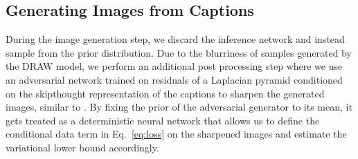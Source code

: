 \documentclass{article} %
\newcommand{\Eqref}[1]{Eq.~\ref{#1}} %
\newcommand{\comm}[1]{}
\newcommand{\henc}{h^{infer}}
\newcommand{\Lat}{Z}
\newcommand{\post}{Q}
\newcommand{\prior}{P}
\newcommand{\loss}{\mathcal{L}}
\begin{document}
\comm{
\begin{align}
\loss &= -\sum_{t=1}^{T}D_{KL}(\post(\Lat_t|\henc_t,s_{t-1})\,||\,\prior(\Lat_t)) + \frac{1}{L}\sum_{l=1}^{L}log\,p(x_{t}|y,z)\\
&=
\frac{1}{2}\sum_{t=1}^{T}(1 - 2\,log\,\sigma_{t}^{prior} + 2\,log\,\sigma_{t} - \frac{\exp(2\,log\,\sigma_{t}) + (\mu_{t} - \mu_{t}^{prior})^{2}}{\exp(2\,log\,\sigma_{t}^{prior})}) + \frac{1}{L}\sum_{l=1}^{L}log\,p(x_{t}|y,z)
\end{align}
}

\subsection{Generating Images from Captions}
\vspace{-0.05in}
During the image generation step, we discard the inference network and instead sample from the prior distribution. 
Due to the blurriness of samples generated by the DRAW model, we perform an additional post processing step where we use an 
adversarial network trained on residuals of a Laplacian pyramid conditioned on the skipthought representation \citep{kiros_skipthought} of the captions 
to sharpen the generated images, similar to \citep{denton_lapgan}. By fixing the prior of the adversarial generator to its mean, it gets treated as a deterministic neural network that allows us to define the conditional data term in \Eqref{eq:loss} on the sharpened images and 
estimate the variational lower bound accordingly. 
\end{document}
